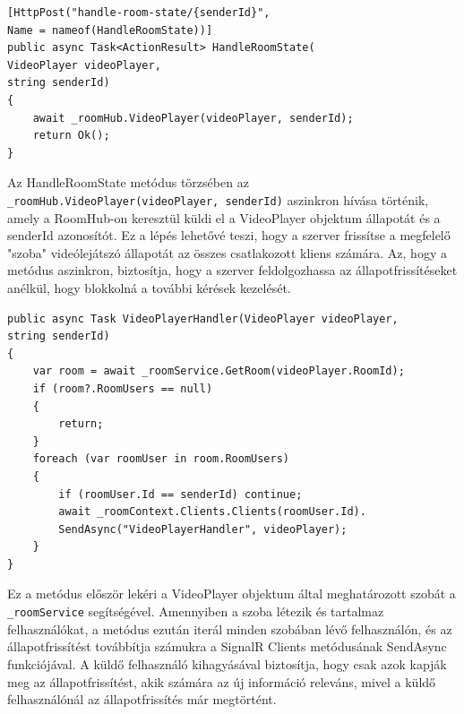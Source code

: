 \begin{lstlisting}[language=CSharp,style=CSharpBase,caption={HandleRoomState metódus}]
[HttpPost("handle-room-state/{senderId}",
Name = nameof(HandleRoomState))]
public async Task<ActionResult> HandleRoomState(
VideoPlayer videoPlayer,
string senderId)
{
    await _roomHub.VideoPlayer(videoPlayer, senderId);
    return Ok();
}
\end{lstlisting}
\vspace{1.5em}
Az HandleRoomState metódus törzsében az \texttt{\_roomHub.VideoPlayer(videoPlayer, senderId)} aszinkron hívása történik, amely a RoomHub-on keresztül küldi el a VideoPlayer objektum állapotát és a senderId azonosítót. Ez a lépés lehetővé teszi, hogy a szerver frissítse a megfelelő "szoba" videólejátszó állapotát az összes csatlakozott kliens számára. Az, hogy a metódus aszinkron, biztosítja, hogy a szerver feldolgozhassa az állapotfrissítéseket anélkül, hogy blokkolná a további kérések kezelését.
\begin{lstlisting}[language=CSharp,style=CSharpBase,caption={VideoPlayerHanler metódus}]
public async Task VideoPlayerHandler(VideoPlayer videoPlayer,
string senderId)
{
    var room = await _roomService.GetRoom(videoPlayer.RoomId);
    if (room?.RoomUsers == null)
    {
        return;
    }
    foreach (var roomUser in room.RoomUsers)
    {
        if (roomUser.Id == senderId) continue;
        await _roomContext.Clients.Clients(roomUser.Id).
        SendAsync("VideoPlayerHandler", videoPlayer);
    }
}
\end{lstlisting}
\vspace{1.5em}
Ez a metódus először lekéri a VideoPlayer objektum által meghatározott szobát a \texttt{\_roomService} segítségével. Amennyiben a szoba létezik és tartalmaz felhasználókat, a metódus ezután iterál minden szobában lévő felhasználón, és az állapotfrissítést továbbítja számukra a SignalR Clients metódusának SendAsync funkciójával. A küldő felhasználó kihagyásával biztosítja, hogy csak azok kapják meg az állapotfrissítést, akik számára az új információ releváns, mivel a küldő felhasználónál az állapotfrissítés már megtörtént.
